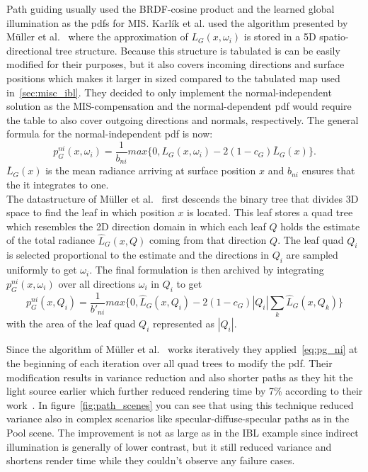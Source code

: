 Path guiding usually used the BRDF-cosine product and the learned global illumination as the pdfs for MIS.
Karl\'ik et al. used the algorithm presented by M\"uller et al.~\cite{mueller2017}
where the approximation of $ L_G(x, \omega_i) $ is stored in a 5D spatio-directional tree structure.
Because this structure is tabulated is can be easily modified for their purposes,
but it also covers incoming directions and surface positions which makes it larger in sized compared to the tabulated map used in~\ref{sec:misc_ibl}.
They decided to only implement the normal-independent solution
as the MIS-compensation and the normal-dependent pdf would require the table to also cover outgoing directions and normals, respectively.
The general formula for the normal-independent pdf is now:
$$ p_G^{ni}(x, \omega_i) = \frac{1}{b_{ni}} max \{ 0, L_G(x, \omega_i) - 2 (1 - c_G) \bar{L}_G(x) \}. $$
$ \bar{L}_G(x) $ is the mean radiance arriving at surface position $ x $ and $ b_{ni} $ ensures that the it integrates to one.\\
The datastructure of M\"uller et al.~\cite{mueller2017} first descends the binary tree that divides 3D space to find the leaf in which position $ x $ is located.
This leaf stores a quad tree which resembles the 2D direction domain in which each leaf $ Q $ holds the estimate of the total radiance $ \hat{L}_G(x, Q) $ coming from that direction $ Q $.
The leaf quad $ Q_i $ is selected proportional to the estimate and the directions in $ Q_i $ are sampled uniformly to get $ \omega_i $.
The final formulation is then archived by integrating $ p_G^{ni}(x, \omega_i) $ over all directions $ \omega_i $ in $ Q_i $ to get
\begin{equation}
    \label{eq:pg_ni}
    p_G^{ni}(x, Q_i) = \frac{1}{b'_{ni}} max \{ 0, \hat{L}_G(x, Q_i) - 2 (1 - c_G) |Q_i| \sum_k \hat{L}_G(x, Q_k) \}
\end{equation}
with the area of the leaf quad $ Q_i $ represented as $ |Q_i| $.

Since the algorithm of M\"uller et al.~\cite{mueller2017} works iteratively they applied~\ref{eq:pg_ni} at the beginning of each iteration over all quad trees to modify the pdf.
Their modification results in variance reduction and also shorter paths
as they hit the light source earlier which further reduced rendering time by 7\% according to their work~\cite[Section~9]{Karlik2019}.
In figure~\ref{fig:path_scenes} you can see that using this technique reduced variance also in complex scenarios like specular-diffuse-specular paths as in the Pool scene.
The improvement is not as large as in the IBL example since indirect illumination is generally of lower contrast,
but it still reduced variance and shortens render time while they couldn't observe any failure cases.

